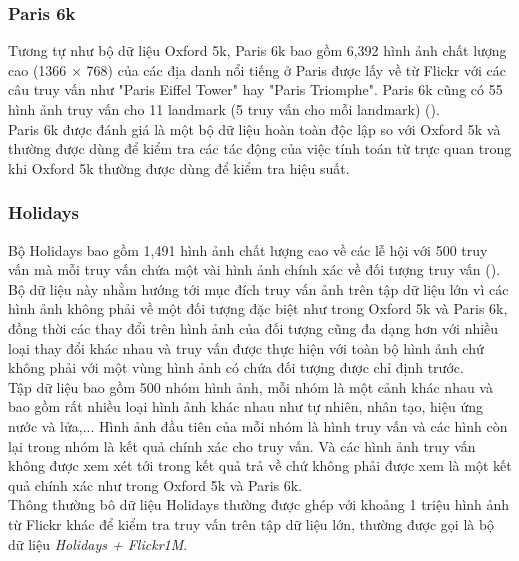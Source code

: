 \subsubsection{Paris 6k}
Tương tự như bộ dữ liệu Oxford 5k, Paris 6k bao gồm 6,392 hình ảnh chất lượng cao (1366 $\times$ 768) của các địa danh nổi tiếng ở Paris được lấy về từ Flickr với các câu truy vấn như "Paris Eiffel Tower" hay "Paris Triomphe". Paris 6k cũng có 55 hình ảnh truy vấn cho 11 landmark (5 truy vấn cho mỗi landmark) (\cite{philbin2008lost}).\\
Paris 6k được đánh giá là một bộ dữ liệu hoàn toàn độc lập so với Oxford 5k và thường được dùng để kiểm tra các tác động của việc tính toán từ trực quan trong khi Oxford 5k thường được dùng để kiểm tra hiệu suất.\\

\subsubsection{Holidays}
Bộ Holidays bao gồm 1,491 hình ảnh chất lượng cao về các lễ hội với 500 truy vấn mà mỗi truy vấn chứa một vài hình ảnh chính xác về đối tượng truy vấn (\cite{JDS08}). Bộ dữ liệu này nhằm hướng tới mục đích truy vấn ảnh trên tập dữ liệu lớn vì các hình ảnh không phải về một đối tượng đặc biệt như trong Oxford 5k và Paris 6k, đồng thời các thay đổi trên hình ảnh của đối tượng cũng đa dạng hơn với nhiều loại thay đổi khác nhau và truy vấn được thực hiện với toàn bộ hình ảnh chứ không phải với một vùng hình ảnh có chứa đối tượng được chỉ định trước.\\
Tập dữ liệu bao gồm 500 nhóm hình ảnh, mỗi nhóm là một cảnh khác nhau và bao gồm rất nhiều loại hình ảnh khác nhau như tự nhiên, nhân tạo, hiệu ứng nước và lửa,... Hình ảnh đầu tiên của mỗi nhóm là hình truy vấn và các hình còn lại trong nhóm là kết quả chính xác cho truy vấn. Và các hình ảnh truy vấn không được xem xét tới trong kết quả trả về chứ không phải được xem là một kết quả chính xác như trong Oxford 5k và Paris 6k.\\
Thông thường bô dữ liệu Holidays thường được ghép với khoảng 1 triệu hình ảnh từ Flickr khác để kiểm tra truy vấn trên tập dữ liệu lớn, thường được gọi là bộ dữ liệu \textit{Holidays + Flickr1M}.\\

